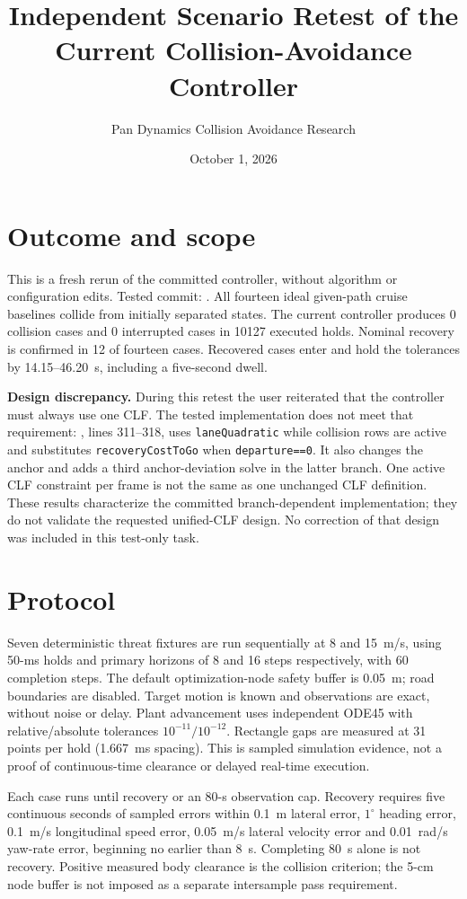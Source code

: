 \documentclass[11pt]{article}
\title{Independent Scenario Retest of the Current Collision-Avoidance Controller}
\author{Pan Dynamics Collision Avoidance Research}
\date{October 1, 2026}
\begin{document}
\maketitle
\section{Outcome and scope}
This is a fresh rerun of the committed controller, without algorithm or
configuration edits. Tested commit: .
All fourteen ideal given-path cruise baselines collide from initially separated
states. The current controller produces 0 collision cases and
0 interrupted cases in 10127 executed holds. Nominal recovery is
confirmed in 12 of fourteen cases. Recovered cases enter and hold the
tolerances by 14.15--46.20~s, including a five-second dwell.

\textbf{Design discrepancy.} During this retest the user reiterated that the
controller must always use one CLF. The tested implementation does not meet
that requirement: , lines 311--318,
uses \texttt{laneQuadratic} while collision rows are active and substitutes
\texttt{recoveryCostToGo} when \texttt{departure==0}. It also changes the anchor
and adds a third anchor-deviation solve in the latter branch. One active CLF
constraint per frame is not the same as one unchanged CLF definition. These
results characterize the committed branch-dependent implementation; they do
not validate the requested unified-CLF design. No correction of that design
was included in this test-only task.

\section{Protocol}
Seven deterministic threat fixtures are run sequentially at 8 and 15~m/s,
using 50-ms holds and primary horizons of 8 and 16 steps respectively, with
60 completion steps. The default optimization-node safety buffer is 0.05~m;
road boundaries are disabled. Target motion is known and observations are
exact, without noise or delay. Plant advancement uses independent ODE45 with
relative/absolute tolerances $10^{-11}/10^{-12}$. Rectangle gaps are measured
at 31 points per hold (1.667~ms spacing). This is sampled simulation evidence,
not a proof of continuous-time clearance or delayed real-time execution.

Each case runs until recovery or an 80-s observation cap. Recovery requires
five continuous seconds of sampled errors within 0.1~m lateral error,
$1^\circ$ heading error, 0.1~m/s longitudinal speed error, 0.05~m/s lateral
velocity error and 0.01~rad/s yaw-rate error, beginning no earlier than 8~s.
Completing 80~s alone is not recovery. Positive measured body clearance is the
collision criterion; the 5-cm node buffer is not imposed as a separate
intersample pass requirement.
\end{document}
